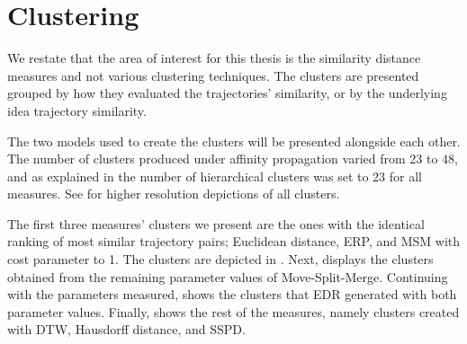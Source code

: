 \section{Clustering}

We restate that the area of interest for this thesis is the similarity distance measures and not various clustering techniques. 
The clusters are presented grouped by how they evaluated the trajectories' similarity, or by the underlying idea trajectory similarity. 

The two models used to create the clusters will be presented alongside each other.
The number of clusters produced under affinity propagation varied from 23 to 48, and as explained in  the number of hierarchical clusters was set to 23 for all measures. See  for higher resolution depictions of all clusters. 


The first three measures’ clusters we present are the ones with the identical ranking of most similar trajectory pairs;
Euclidean distance, ERP, and MSM with cost parameter to 1. The clusters are depicted in . Next,  displays the clusters obtained from the remaining parameter values of Move-Split-Merge.
Continuing with the parameters measured,  shows the clusters that EDR generated with both parameter values. 
Finally,  shows the rest of the measures, namely clusters created with DTW, Hausdorff distance, and SSPD.



